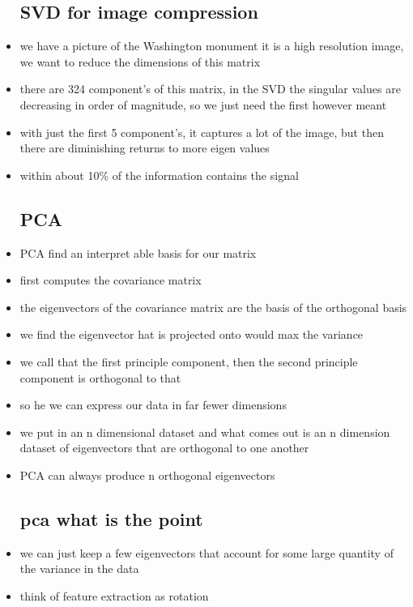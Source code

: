 \documentclass{article}
\begin{document}
\begin{itemize}
\subsection{SVD for image compression}
\item we have a picture of the Washington monument it is a high resolution image, we want to reduce the dimensions of this matrix
\item there are 324 component's of this matrix, in the SVD the singular values are decreasing in order of magnitude, so we just need the first however meant
\item with just the first 5 component's, it captures a lot of the image, but then there are diminishing returns to more eigen values 
\item within about 10\% of the information contains the signal 
\subsection{PCA}
\item PCA find an interpret able basis for our matrix 
\item first computes the covariance matrix 
\item the eigenvectors of the covariance matrix are the basis of the orthogonal basis 
\item we find the eigenvector hat is projected onto would max the variance 
\item we call that the first principle component, then the second principle component is orthogonal to that 
\item so he we can express our data in far fewer dimensions 
\item we put in an n dimensional dataset and what comes out is an n dimension dataset of eigenvectors that are orthogonal to one another 
\item PCA can always produce n orthogonal eigenvectors 
\subsection{pca what is the point}
\item we can just keep a few eigenvectors that account for some large quantity of the variance in the data
\item think of feature extraction as rotation 

\end{itemize}
\end{document}
